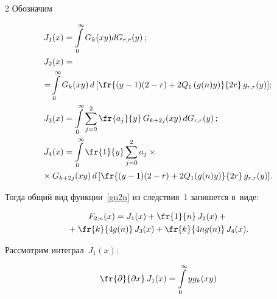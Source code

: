 \begin{multicols}{2}
Обозначим


\begin{align*}


 J_1(x) &= \int\limits^{\infty}_{0} G_k(xy)dG_{r,r}(y)\,;\\


 J_2(x) &= {}\\


 &\hspace*{-9mm}{}= \!


\int\limits^{\infty}_{0} G_k(xy) \,d\left[  \fr{(y - 1)(2 - r) + 2 


Q_1\left(g(n)y\right)}{2 r}\,g_{r,r}(y) \right]\!;\hspace*{-0.60292pt}


 \\


 J_{3}(x) &=\int\limits_{0}^\infty \sum\limits_{j=0}^{2} \fr{a_j}{y}\, 


G_{k+2j}(xy)\,dG_{r,r}(y)\,;\\


 J_{4}(x) &= \int\limits_{0}^\infty \fr{1}{y} \sum\limits_{j=0}^{2}


 a_j \times{}\\


 &\hspace*{-9mm}{}\times G_{k+2j}(xy)\,d\left[  


\fr{(y - 1)(2 - r) + 2 Q_1(g(n)y)}{2 r}\,g_{r,r}(y) \right]\!.


 \end{align*}





Тогда общий вид функции~\eqref{gn2n} из следствия~1 запишется в~виде:


\begin{multline*}




F_{2;n}(x) = J_1(x) + \fr{1}{n}\,J_2(x) +{}\\


{}+ \fr{k}{4g(n)} \,J_3(x) 


+ \fr{k}{4ng(n)}\,J_4(x).


\end{multline*}





Рассмотрим интеграл~$J_1(x)$:


\begin{multline*}


\fr{\partial}{\partial x}\, J_1(x) =  \int\limits^{\infty}_{0} y  g_k(xy)  



\end{multline*}
\end{multicols}
